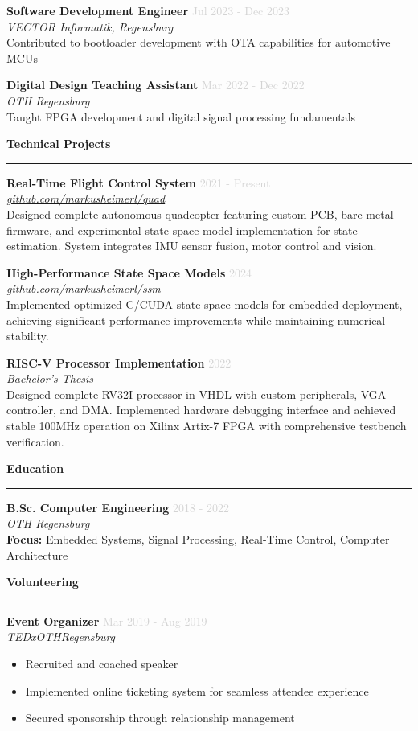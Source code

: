 \documentclass[a4paper,10pt]{article}
\newcommand{\cvsection}[1]{
    \vspace{12pt}
    {\large\bfseries\color{darkgray} #1}
    \vspace{4pt}
    \hrule
    \vspace{8pt}
}
\newcommand{\cventry}[4]{
    \vspace{3pt}
    \textbf{\color{darkgray}#1} \hfill \textcolor{lightgray}{\small #2} \\
    \textcolor{primaryblue}{\textit{\small #3}} \\
    \vspace{3pt}
    {\small #4}
    \vspace{8pt}
}
\newcommand{\cvproject}[3]{
    \vspace{3pt}
    \textbf{\color{darkgray}#1} \hfill \textcolor{lightgray}{\small #2} \\
    \textcolor{primaryblue}{\textit{\small #3}} \\[3pt]
}
\begin{document}
\begin{paracol}{2}
\cventry{Software Development Engineer}{Jul 2023 - Dec 2023}{VECTOR Informatik, Regensburg}{
    Contributed to bootloader development with OTA capabilities for automotive MCUs
}

\cventry{Digital Design Teaching Assistant}{Mar 2022 - Dec 2022}{OTH Regensburg}{
    Taught FPGA development and digital signal processing fundamentals
}

\cvsection{Technical Projects}

\cvproject{Real-Time Flight Control System}{2021 - Present}{\href{https://github.com/markusheimerl/quad}{github.com/markusheimerl/quad}}
{\small Designed complete autonomous quadcopter featuring custom PCB, bare-metal firmware, and experimental state space model implementation for state estimation. System integrates IMU sensor fusion, motor control and vision.}

\vspace{8pt}

\cvproject{High-Performance State Space Models}{2024}{\href{https://github.com/markusheimerl/ssm}{github.com/markusheimerl/ssm}}
{\small Implemented optimized C/CUDA state space models for embedded deployment, achieving significant performance improvements while maintaining numerical stability.}

\vspace{8pt}

\cvproject{RISC-V Processor Implementation}{2022}{Bachelor's Thesis}
{\small Designed complete RV32I processor in VHDL with custom peripherals, VGA controller, and DMA. Implemented hardware debugging interface and achieved stable 100MHz operation on Xilinx Artix-7 FPGA with comprehensive testbench verification.}

\cvsection{Education}

\cventry{B.Sc. Computer Engineering}{2018 - 2022}{OTH Regensburg}{
    \textbf{Focus:} Embedded Systems, Signal Processing, Real-Time Control, Computer Architecture\\
}

\cvsection{Volunteering}

\cventry{Event Organizer}{Mar 2019 - Aug 2019}{TEDxOTHRegensburg}{
    \begin{itemize}[leftmargin=10pt, itemsep=2pt, parsep=0pt, topsep=3pt]
        \item Recruited and coached speaker
        \item Implemented online ticketing system for seamless attendee experience
        \item Secured sponsorship through relationship management
    \end{itemize}
}

\vspace{0.5cm}

\end{paracol}
\end{document}
